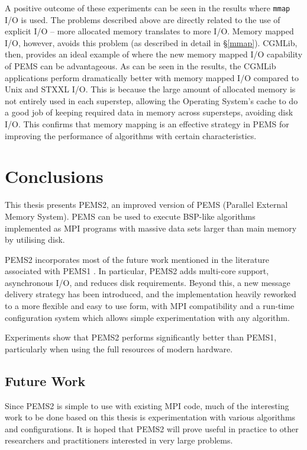 \documentclass[12pt]{carletoncsthesis}
\begin{document}
A positive outcome of these experiments can be seen in the results where
{\tt mmap} I/O is used.  The problems described above are directly related
to the use of explicit I/O -- more allocated memory translates to more I/O.
Memory mapped I/O, however, avoids this problem (as described in detail
in \S\ref{mmap}).  CGMLib, then, provides an ideal example of where the
new memory mapped I/O capability of PEMS can be advantageous.  As can be
seen in the results, the CGMLib applications perform dramatically better
with memory mapped I/O compared to Unix and STXXL I/O.  This is because
the large amount of allocated memory is not entirely used in each superstep,
allowing the Operating System's cache to do a good job of keeping required
data in memory across supersteps, avoiding disk I/O.  This confirms that
memory mapping is an effective strategy in PEMS for improving the performance
of algorithms with certain characteristics.


\chapter{Conclusions}
\thispagestyle{empty}
\label{conclusions-ch}


This thesis presents PEMS2, an improved version of PEMS (Parallel External
Memory System).  PEMS can be used to execute BSP-like algorithms implemented as
MPI programs with massive data sets larger than main memory by utilising disk.

PEMS2 incorporates most of the future work mentioned in the literature
associated with PEMS1 \cite{mnthesis}.  In particular, PEMS2 adds multi-core
support, asynchronous I/O, and reduces disk requirements.  Beyond this, a new
message delivery strategy has been introduced, and the implementation heavily
reworked to a more flexible and easy to use form, with MPI compatibility
and a run-time configuration system which allows simple experimentation with
any algorithm.

Experiments show that PEMS2 performs significantly better than PEMS1,
particularly when using the full resources of modern hardware.

\section{Future Work}
\label{future}


Since PEMS2 is simple to use with existing MPI code, much of the interesting
work to be done based on this thesis is experimentation with various algorithms
and configurations.  It is hoped that PEMS2 will prove useful in practice
to other researchers and practitioners interested in very large problems.
\end{document}
